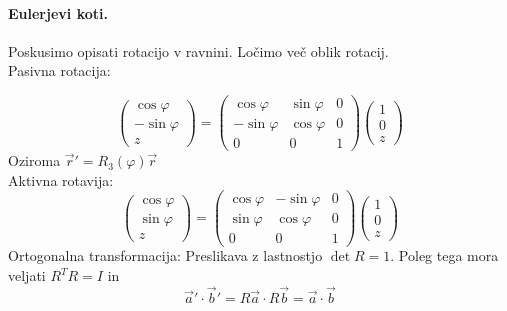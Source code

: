 \documentclass[a4paper]{article}
\newcommand{\vct}[1]{\overrightarrow{#1}}
\begin{document}
\paragraph{Eulerjevi koti.} Poskusimo opisati rotacijo v ravnini. Ločimo več oblik rotacij. \\[2mm]
Pasivna rotacija:
\begin{figure}[h!]
    \centering
\end{figure}
$$\begin{pmatrix}
    \cos\varphi \\ -\sin\varphi \\ z
\end{pmatrix} =
\begin{pmatrix}
    \cos\varphi & \sin\varphi & 0 \\
    -\sin\varphi & \cos\varphi & 0 \\
    0 & 0 & 1
\end{pmatrix} \begin{pmatrix}
    1 \\ 0 \\ z
\end{pmatrix}$$
Oziroma $\vct{r}' = R_{3}(\varphi) \vct{r}$ \\[2mm]
Aktivna rotavija:
$$\begin{pmatrix}
    \cos\varphi \\ \sin\varphi \\ z
\end{pmatrix} =
\begin{pmatrix}
    \cos\varphi & -\sin\varphi & 0 \\
    \sin\varphi & \cos\varphi & 0 \\
    0 & 0 & 1
\end{pmatrix} \begin{pmatrix}
    1 \\ 0 \\ z
\end{pmatrix}$$
Ortogonalna transformacija: Preslikava z lastnostjo $\det R = 1$. Poleg tega mora veljati $R^TR = I$ in
$$\vct{a}'\cdot\vct{b}' = R\vct{a}\cdot R\vct{b} = \vct{a}\cdot\vct{b}$$
\end{document}
